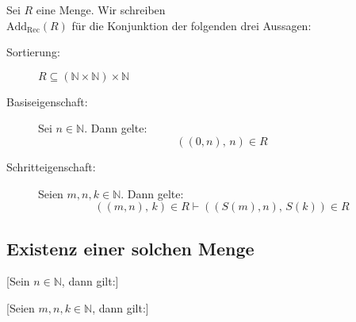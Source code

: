 \documentclass[main.tex]{subfiles}
\begin{document}
\begin{definition}
Sei \(R\) eine Menge. Wir schreiben\\ \(\mathrm{Add}_{\mathrm{Rec}}(R)\) für die
Konjunktion der folgenden drei Aussagen:
\begin{description}
  \item[Sortierung:] \( R \subseteq (\mathbb{N}\times\mathbb{N})\times\mathbb{N}\)
  \item[Basiseigenschaft:] Sei \(n\in\mathbb{N}\). Dann gelte: \[((0,n),\,n)\in R\]
  \item[Schritteigenschaft:] Seien \(m,n,k\in\mathbb{N}\). 
  Dann gelte: \[((m,n),\,k)\in R\vdash ((S(m),n),\,S(k))\in R\]
\end{description}
\end{definition}

\subsection{Existenz einer solchen Menge}

[Sein \(n\in\mathbb{N}\), dann gilt:]
\begin{tabproof}
\end{tabproof}

[Seien \(m,n,k\in\mathbb{N}\), dann gilt:]
\begin{tabproof}
\end{tabproof}

\begin{tabproof}
\end{tabproof}
\end{document}
